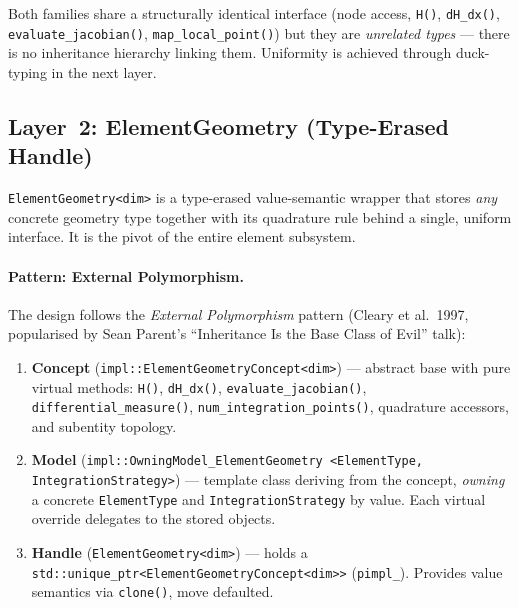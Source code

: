 Both families share a structurally identical interface (node access,
\texttt{H()}, \texttt{dH\_dx()}, \texttt{evaluate\_jacobian()},
\texttt{map\_local\_point()}) but they are \emph{unrelated types} ---
there is no inheritance hierarchy linking them.  Uniformity is achieved
through duck-typing in the next layer.


\subsection{Layer~2: ElementGeometry (Type-Erased Handle)}
\label{sec:elem_geom}

\texttt{ElementGeometry<dim>} is a type-erased value-semantic wrapper that
stores \emph{any} concrete geometry type together with its quadrature rule
behind a single, uniform interface.  It is the pivot of the entire element
subsystem.

\paragraph{Pattern: External Polymorphism.}
The design follows the \emph{External Polymorphism} pattern
(Cleary et al.\ 1997, popularised by Sean Parent's ``Inheritance Is the Base
Class of Evil'' talk):

\begin{enumerate}[nosep]
  \item \textbf{Concept} (\texttt{impl::ElementGeometryConcept<dim>}) ---
        abstract base with pure virtual methods: \texttt{H()},
        \texttt{dH\_dx()}, \texttt{evaluate\_jacobian()},
        \texttt{differential\_measure()}, \texttt{num\_integration\_points()},
        quadrature accessors, and subentity topology.

  \item \textbf{Model} (\texttt{impl::OwningModel\_ElementGeometry%
        <ElementType, IntegrationStrategy>}) ---
        template class deriving from the concept, \emph{owning} a concrete
        \texttt{ElementType} and \texttt{IntegrationStrategy} by value.
        Each virtual override delegates to the stored objects.

  \item \textbf{Handle} (\texttt{ElementGeometry<dim>}) ---
        holds a \texttt{std::unique\_ptr<ElementGeometryConcept<dim>>}
        (\texttt{pimpl\_}).  Provides value semantics via \texttt{clone()},
        move defaulted.
\end{enumerate}


